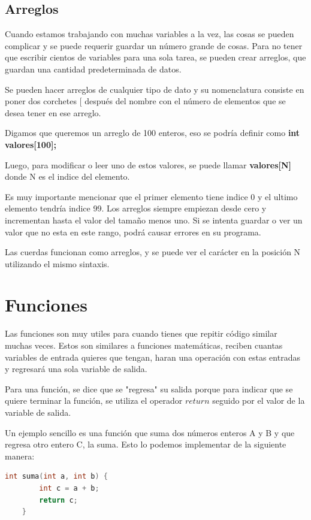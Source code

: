 \documentclass{article}
\begin{document}
\subsection{Arreglos}

Cuando estamos trabajando con muchas variables a la vez, las cosas se pueden complicar y se puede requerir guardar un número grande de cosas. Para no tener que escribir cientos de variables para una sola tarea, se pueden crear arreglos, que guardan una cantidad predeterminada de datos.

Se pueden hacer arreglos de cualquier tipo de dato y su nomenclatura consiste en poner dos corchetes $[$ después del nombre con el número de elementos que se desea tener en ese arreglo.

Digamos que queremos un arreglo de 100 enteros, eso se podría definir como \textbf{int valores[100];}

Luego, para modificar o leer uno de estos valores, se puede llamar \textbf{valores[N]} donde N es el indice del elemento.

Es muy importante mencionar que el primer elemento tiene indice 0 y el ultimo elemento tendría indice 99. Los arreglos siempre empiezan desde cero y incrementan hasta el valor del tamaño menos uno. Si se intenta guardar o ver un valor que no esta en este rango, podrá causar errores en su programa.

Las cuerdas funcionan como arreglos, y se puede ver el carácter en la posición N utilizando el mismo sintaxis.

\section{Funciones}

Las funciones son muy utiles para cuando tienes que repitir código similar muchas veces. Estos son similares a funciones matemáticas, reciben cuantas variables de entrada quieres que tengan, haran una operación con estas entradas y regresará una sola variable de salida.

Para una función, se dice que se "regresa" su salida porque para indicar que se quiere terminar la función, se utiliza el operador $return$ seguido por el valor de la variable de salida.

Un ejemplo sencillo es una función que suma dos números enteros A y B y que regresa otro entero C, la suma. Esto lo podemos implementar de la siguiente manera:

\begin{lstlisting}[language=C++, caption=Función de suma]
    int suma(int a, int b) {
        int c = a + b;
        return c;
    }
\end{lstlisting}
\end{document}
